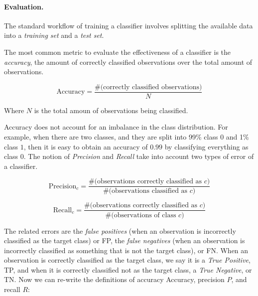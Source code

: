 \paragraph{Evaluation.}

The standard workflow of training a classifier involves splitting the available
data into a {\em training set} and a {\em test set}. 
%



The most common metric to evaluate the effectiveness of a classifier is the {\em
accuracy}, the amount of correctly classified observations over the total amount of
observations.

\begin{equation}
    \text{Accuracy} = \frac{\text{\#(correctly\ classified\ observations)}}{N}
\end{equation}

Where $N$ is the total amoun of observations being classified.

Accuracy does not account for an imbalance in the class distribution.
%
For example, when there are two classes, and they are split into 99\% class $0$
and 1\% class $1$, then it is easy to obtain an accuracy of $0.99$ by
classifying everything as class $0$.
%
The notion of {\em Precision} and {\em Recall} take into account two types of
error of a classifier.

\begin{equation}
    \text{Precision}_c = \frac{\text{\#(observations\ correctly\ classified\ as\ } c \text{)}}{ \text{\#(observations\ classified\ as\ } c \text{)} }
\end{equation}

\begin{equation}
    \text{Recall}_c = \frac{\text{\#(observations\ correctly\ classified\ as\ } c \text{)}}{ \text{\#(observations\ of\ class\ } c\text{)} } 
\end{equation}

The related errors are the {\em false positives} (when an observation is
incorrectly classified as the target class) or FP, the {\em false negatives}
(when an observation is incorrectly classified as something that is not the
target class), or FN. 
%
When an observation is correctly classified as the target class, we say it is a
{\em True Positive}, TP, and when it is correctly classified not as the target
class, a {\em True Negative}, or TN.
%
Now we can re-write the definitions of accuracy Accuracy, precision $P$, and recall
$R$:

